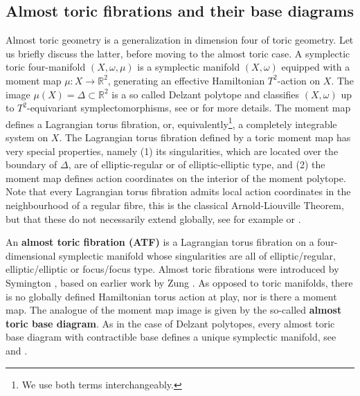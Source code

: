 \documentclass[AIF,Unicode,manuscript]{cedram}
\begin{document}
\subsection{Almost toric fibrations and their base diagrams}
\label{sec:atgeometry}

Almost toric geometry is a generalization in dimension four of toric geometry.
Let us briefly discuss the latter, before moving to the almost toric case.
A symplectic toric four-manifold $(X,\omega,\mu)$ is a symplectic manifold $(X,\omega)$ equipped with a moment map $\mu \colon X \rightarrow \mathbb{R}^2$, generating an effective Hamiltonian $T^2$-action on $X$.
The image $\mu(X) = \Delta \subset \mathbb{R}^2$ is a so called Delzant polytope and classifies $(X,\omega)$ up to $T^2$-equivariant symplectomorphisms, see \cite{Del88} or \cite{Can03} for more details.
The moment map defines a Lagrangian torus fibration, or, equivalently\footnote{We use both terms interchangeably.}, a completely integrable system on $X$.
The Lagrangian torus fibration defined by a toric moment map has very special properties, namely (1) its singularities, which are located over the boundary of $\Delta$, are of elliptic-regular or of elliptic-elliptic type, and (2) the moment map defines action coordinates on the interior of the moment polytope.
Note that every Lagrangian torus fibration admits local action coordinates in the neighbourhood of a regular fibre, this is the classical Arnold-Liouville Theorem, but that these do not necessarily extend globally, see for example \cite{Dui80} or \cite{Zun96,Zun03}.

An \textbf{almost toric fibration (ATF)} is a Lagrangian torus fibration on a four-dimensional symplectic manifold whose singularities are all of elliptic\-/regular, elliptic\-/elliptic or focus\-/focus type.
Almost toric fibrations were introduced by Sy\-ming\-ton \cite{symington2002FourDF}, based on earlier work by Zung \cite{Zun96,Zun97,Zun03}.
As opposed to toric manifolds, there is no globally defined Hamiltonian torus action at play, nor is there a moment map.
The analogue of the moment map image is given by the so-called \textbf{almost toric base diagram}.
As in the case of Delzant polytopes, every almost toric base diagram with contractible base defines a unique symplectic manifold, see \cite[Corollary 5.4]{symington2002FourDF} and \cite[Theorem 8.5]{evans2021atfs}. 
\end{document}
